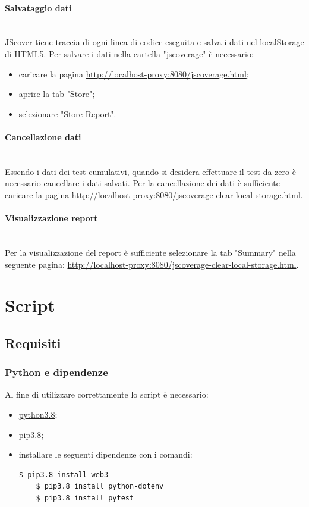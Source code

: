 \documentclass[a4paper, 12pt]{article}
\begin{document}
\paragraph{Salvataggio dati}\\
JScover tiene traccia di ogni linea di codice eseguita e salva i dati nel localStorage di HTML5. Per salvare i dati nella cartella "jscoverage" è necessario:
\begin{itemize}
  \item caricare la pagina \url{http://localhost-proxy:8080/jscoverage.html};
  \item aprire la tab "Store";
  \item selezionare "Store Report".
\end{itemize}
\paragraph{Cancellazione dati}\\
Essendo i dati dei test cumulativi, quando si desidera effettuare il test da zero è necessario cancellare i dati salvati. Per la cancellazione dei dati è sufficiente caricare la pagina \url{http://localhost-proxy:8080/jscoverage-clear-local-storage.html}.
\paragraph{Visualizzazione report}\\
Per la visualizzazione del report è sufficiente selezionare la tab "Summary" nella seguente pagina:  \url{http://localhost-proxy:8080/jscoverage-clear-local-storage.html}.
\newpage{}
\section{Script}
\subsection{Requisiti}
\subsubsection{Python e dipendenze}
Al fine di utilizzare correttamente lo script è necessario:
\begin{itemize}
  \item \href{https://www.python.org/downloads/}{python3.8};
  \item pip3.8;
  \item installare le seguenti dipendenze con i comandi:
  \begin{lstlisting}[language=bash]
    $ pip3.8 install web3
    $ pip3.8 install python-dotenv
    $ pip3.8 install pytest
  \end{lstlisting}
\end{itemize}
\end{document}
